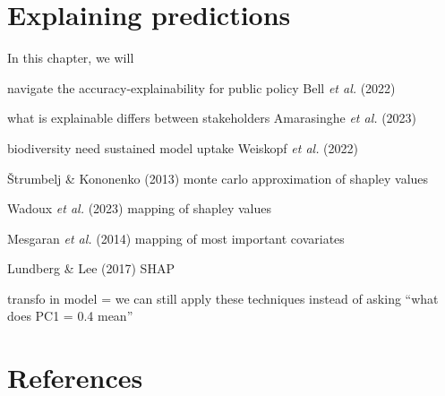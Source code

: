 \documentclass[
  letterpaper,
]{scrbook}
\begin{document}

\chapter{Explaining predictions}\label{sec-explanations}

In this chapter, we will

navigate the accuracy-explainability for public policy Bell \emph{et
al.} (2022)

what is explainable differs between stakeholders Amarasinghe \emph{et
al.} (2023)

biodiversity need sustained model uptake Weiskopf \emph{et al.} (2022)

Štrumbelj \& Kononenko (2013) monte carlo approximation of shapley
values

Wadoux \emph{et al.} (2023) mapping of shapley values

Mesgaran \emph{et al.} (2014) mapping of most important covariates

Lundberg \& Lee (2017) SHAP

transfo in model = we can still apply these techniques instead of asking
``what does PC1 = 0.4 mean''


\chapter*{References}\label{references}

\end{document}
